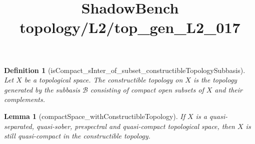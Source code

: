 \documentclass{article}
\title{ShadowBench topology/L2/top\_gen\_L2\_017}
\newtheorem{lemma}{Lemma}
\newtheorem{definition}{Definition}
\begin{document}
\maketitle

\begin{definition}[isCompact_sInter_of_subset_constructibleTopologySubbasis] Let \(X\) be a topological space. The \emph{constructible topology} on \(X\) is the topology generated by the subbasis
\(\mathcal B\) consisting of compact open subsets of \(X\) and their complements.
\end{definition}

\begin{lemma}[compactSpace_withConstructibleTopology]
If \(X\) is a quasi-separated, quasi-sober, prespectral and quasi-compact topological space, then \(X\)
is still quasi-compact in the constructible topology.
\end{lemma}
\end{document}
